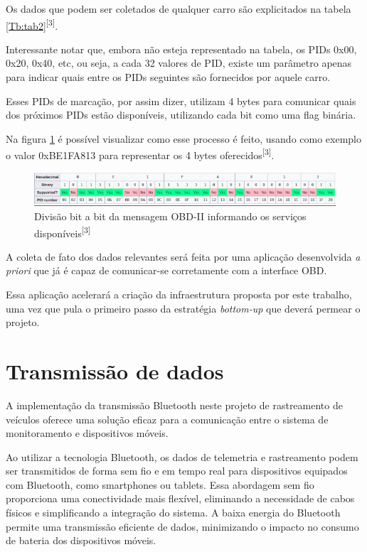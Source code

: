 Os dados que podem ser coletados de qualquer carro são explicitados na tabela \ref{Tb:tab2}\textsuperscript{[3]}.



Interessante notar que, embora não esteja representado na tabela, os PIDs 0x00, 0x20, 0x40, etc, ou seja, a cada 32 valores de PID, existe um parâmetro apenas para indicar quais entre os PIDs seguintes são fornecidos por aquele carro.

Esses PIDs de marcação, por assim dizer, utilizam 4 bytes para comunicar quais dos próximos PIDs estão disponíveis, utilizando cada bit como uma flag binária. 

Na figura \ref{fig:bitwise_obd2} é possível visualizar como esse processo é feito, usando como exemplo o valor 0xBE1FA813 para representar os 4 bytes oferecidos\textsuperscript{[3]}.

\begin{figure}[hp]
    \centering
    
    \includegraphics[scale=0.7]{figures/tabela_dados_disponiveis.png}
    
    \caption{Divisão bit a bit da mensagem OBD-II informando os serviços disponíveis\textsuperscript{[3]}}
    
    \label{fig:bitwise_obd2}
\end{figure}

A coleta de fato dos dados relevantes será feita por uma aplicação desenvolvida \textit{a priori} que já é capaz de comunicar-se corretamente com a interface OBD.

Essa aplicação acelerará a criação da infraestrutura proposta por este trabalho, uma vez que pula o primeiro passo da estratégia \textit{bottom-up} que deverá permear o projeto.

\section{Transmissão de dados}

A implementação da transmissão Bluetooth neste projeto de rastreamento de veículos oferece uma solução eficaz para a comunicação entre o sistema de monitoramento e dispositivos móveis. 

Ao utilizar a tecnologia Bluetooth, os dados de telemetria e rastreamento podem ser transmitidos de forma sem fio e em tempo real para dispositivos equipados com Bluetooth, como smartphones ou tablets. Essa abordagem sem fio proporciona uma conectividade mais flexível, eliminando a necessidade de cabos físicos e simplificando a integração do sistema. A baixa energia do Bluetooth permite uma transmissão eficiente de dados, minimizando o impacto no consumo de bateria dos dispositivos móveis.

